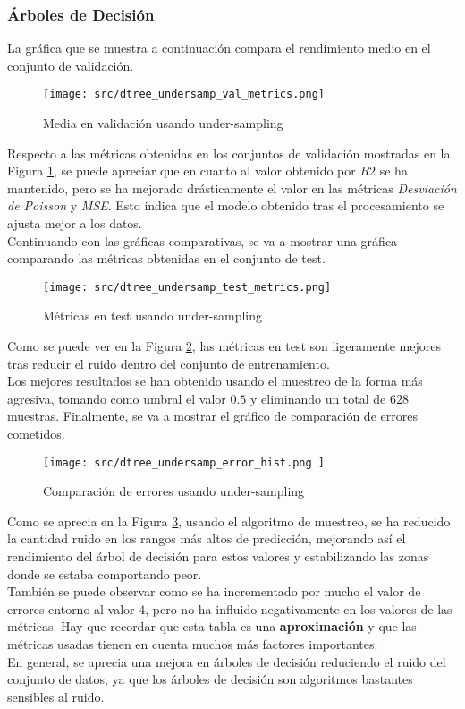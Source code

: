 \subsubsection*{Árboles de Decisión}
La gráfica que se muestra a continuación compara el rendimiento medio en el conjunto de validación.
\begin{figure}[H]
	\centering
	\texttt{[image: src/dtree\_undersamp\_val\_metrics.png]}
	\caption{Media en validación usando under-sampling}
	\label{fig:cmp_val_dtree}
\end{figure}
Respecto a las métricas obtenidas en los conjuntos de validación mostradas en la Figura \ref{fig:cmp_val_dtree}, se puede apreciar que en cuanto al valor obtenido por $R2$ se ha mantenido, pero se ha mejorado drásticamente el valor en las métricas \textit{Desviación de Poisson} y \textit{MSE}. Esto indica que el modelo obtenido tras el procesamiento se ajusta mejor a los datos.\\
\linebreak
Continuando con las gráficas comparativas, se va a mostrar una gráfica comparando las métricas obtenidas en el conjunto de test.
\begin{figure}[H]
	\centering
	\texttt{[image: src/dtree\_undersamp\_test\_metrics.png]}
	\caption{Métricas en test usando under-sampling}
	\label{fig:cmp_test_dtree}
\end{figure}
Como se puede ver en la Figura \ref{fig:cmp_test_dtree}, las métricas en test son ligeramente mejores tras reducir el ruido dentro del conjunto de entrenamiento.\\
Los mejores resultados se han obtenido usando el muestreo de la forma más agresiva, tomando como umbral el valor $0.5$ y eliminando un total de $628$ muestras.
\clearpage
Finalmente, se va a mostrar el gráfico de comparación de errores cometidos.
\begin{figure}[H]
	\centering
	\texttt{[image: src/dtree\_undersamp\_error\_hist.png ]}
	\caption{Comparación de errores usando under-sampling}
	\label{fig:cmp_error_dtree}
\end{figure}
Como se aprecia en la Figura \ref{fig:cmp_error_dtree}, usando el algoritmo de muestreo, se ha reducido la cantidad ruido en los rangos más altos de predicción, mejorando así el rendimiento del árbol de decisión para estos valores y estabilizando las zonas donde se estaba comportando peor.\\
\linebreak
También se puede observar como se ha incrementado por mucho el valor de errores entorno al valor $4$, pero no ha influido negativamente en los valores de las métricas. Hay que recordar que esta tabla es una \textbf{aproximación} y que las métricas usadas tienen en cuenta muchos más factores importantes.\\
\linebreak
En general, se aprecia una mejora en árboles de decisión reduciendo el ruido del conjunto de datos, ya que los árboles de decisión son algoritmos bastantes sensibles al ruido.
\clearpage
